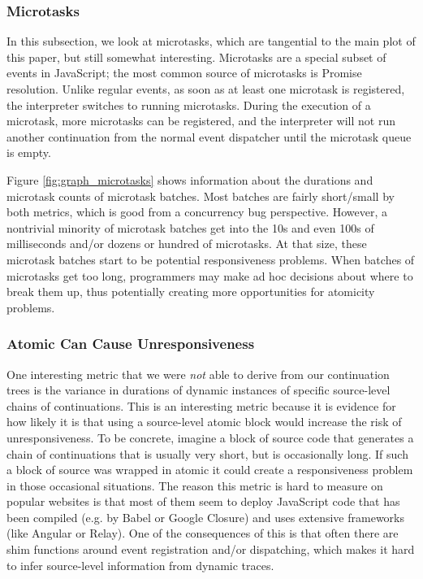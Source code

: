 \documentclass[acmsmall,anonymous,review]{acmart}\settopmatter{printfolios=true,printccs=false,printacmref=false}
\begin{document}
\subsubsection{Microtasks}

In this subsection, we look at microtasks, which are tangential to the main plot of this paper, but still somewhat interesting.
Microtasks are a special subset of events in JavaScript; the most common source of microtasks is Promise resolution.
Unlike regular events, as soon as at least one microtask is registered, the interpreter switches to running microtasks.
During the execution of a microtask, more microtasks can be registered, and the interpreter will not run another continuation from the normal event dispatcher until the microtask queue is empty.

Figure \ref{fig:graph_microtasks} shows information about the durations and microtask counts of microtask batches.
Most batches are fairly short/small by both metrics, which is good from a concurrency bug perspective.
However, a nontrivial minority of microtask batches get into the 10s and even 100s of milliseconds and/or dozens or hundred of microtasks.
At that size, these microtask batches start to be potential responsiveness problems.
When batches of microtasks get too long, programmers may make ad hoc decisions about where to break them up, thus potentially creating more opportunities for atomicity problems.

\subsubsection{Atomic Can Cause Unresponsiveness}

One interesting metric that we were \emph{not} able to derive from our continuation trees is the variance in durations of dynamic instances of specific source-level chains of continuations.
This is an interesting metric because it is evidence for how likely it is that using a source-level atomic block would increase the risk of unresponsiveness.
To be concrete, imagine a block of source code that generates a chain of continuations that is usually very short, but is occasionally long.
If such a block of source was wrapped in atomic it could create a responsiveness problem in those occasional situations.
The reason this metric is hard to measure on popular websites is that most of them seem to deploy JavaScript code that has been compiled (e.g. by Babel or Google Closure) and uses extensive frameworks (like Angular or Relay).
One of the consequences of this is that often there are shim functions around event registration and/or dispatching, which makes it hard to infer source-level information from dynamic traces.
\end{document}
